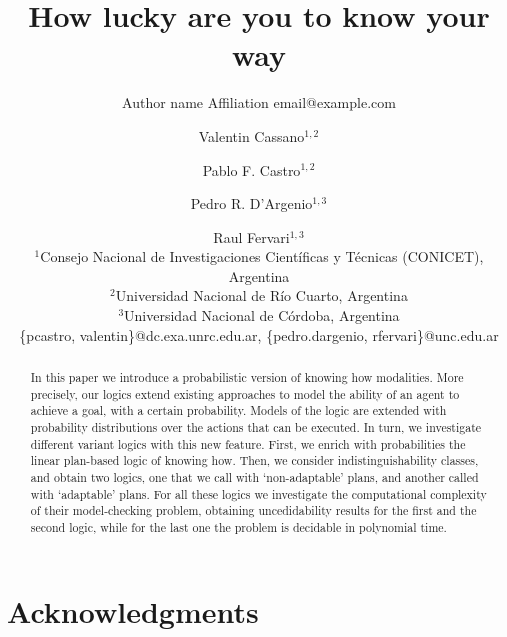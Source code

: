 \documentclass{article}
\title{How lucky are you to know your way}
\author{%
    Author name
    \affiliations
    Affiliation
    \emails
    email@example.com    %
}
\author{%
Valentin Cassano$^{1,2}$\and
Pablo F. Castro$^{1,2}$\and
Pedro R. D'Argenio$^{1,3}$\and
Raul Fervari$^{1,3}$ \\
\affiliations
$^1$Consejo Nacional de Investigaciones Cient\'ificas y T\'ecnicas (CONICET), Argentina\\
$^2$Universidad Nacional de R\'io Cuarto, Argentina\\
$^3$Universidad Nacional de C\'ordoba, Argentina\\
\emails
\{pcastro, valentin\}@dc.exa.unrc.edu.ar,
\{pedro.dargenio, rfervari\}@unc.edu.ar
}
\begin{document}
\maketitle

\begin{abstract}
  In this paper we introduce a probabilistic version of knowing how modalities. More precisely, our logics extend existing approaches to model the ability of an agent to achieve a goal, with a certain probability. Models of the logic are extended with probability distributions over the actions that can be executed. In turn, we investigate different variant logics with this new feature. First, we enrich with probabilities the linear plan-based logic of knowing how. Then, we consider indistinguishability classes, and obtain two logics, one that we call with `non-adaptable' plans, and another called with `adaptable' plans. For all these logics we investigate the computational complexity of their model-checking problem, obtaining uncedidability results for the first and the second logic, while for the last one the problem is decidable in polynomial time.
\end{abstract}






\section*{Acknowledgments}



\appendix






\end{document}

